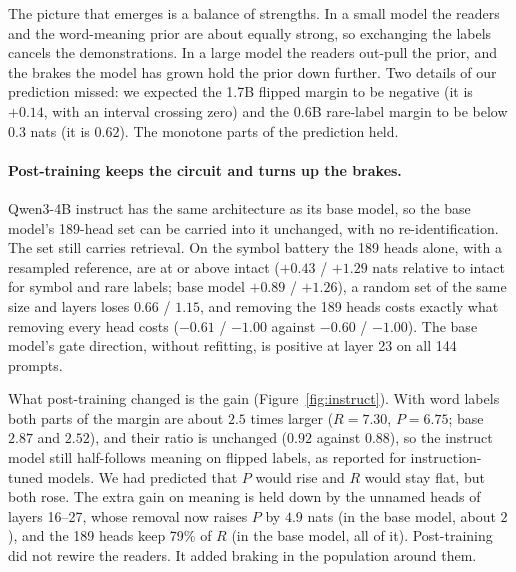 \documentclass{article}
\begin{document}
The picture that emerges is a balance of strengths. In a small model the readers and the word-meaning prior are about equally strong, so exchanging the labels cancels the demonstrations. In a large model the readers out-pull the prior, and the brakes the model has grown hold the prior down further. Two details of our prediction missed: we expected the 1.7B flipped margin to be negative (it is $+0.14$, with an interval crossing zero) and the 0.6B rare-label margin to be below $0.3$ nats (it is $0.62$). The monotone parts of the prediction held.

\paragraph{Post-training keeps the circuit and turns up the brakes.} Qwen3-4B instruct has the same architecture as its base model, so the base model's 189-head set can be carried into it unchanged, with no re-identification. The set still carries retrieval. On the symbol battery the 189 heads alone, with a resampled reference, are at or above intact ($+0.43$ / $+1.29$ nats relative to intact for symbol and rare labels; base model $+0.89$ / $+1.26$), a random set of the same size and layers loses $0.66$ / $1.15$, and removing the 189 heads costs exactly what removing every head costs ($-0.61$ / $-1.00$ against $-0.60$ / $-1.00$). The base model's gate direction, without refitting, is positive at layer 23 on all 144 prompts.

What post-training changed is the gain (Figure~\ref{fig:instruct}). With word labels both parts of the margin are about $2.5$ times larger ($R=7.30$, $P=6.75$; base $2.87$ and $2.52$), and their ratio is unchanged ($0.92$ against $0.88$), so the instruct model still half-follows meaning on flipped labels, as \citet{wei2023larger} reported for instruction-tuned models. We had predicted that $P$ would rise and $R$ would stay flat, but both rose. The extra gain on meaning is held down by the unnamed heads of layers 16--27, whose removal now raises $P$ by $4.9$ nats (in the base model, about $2$), and the 189 heads keep 79\% of $R$ (in the base model, all of it). Post-training did not rewire the readers. It added braking in the population around them.
\end{document}
